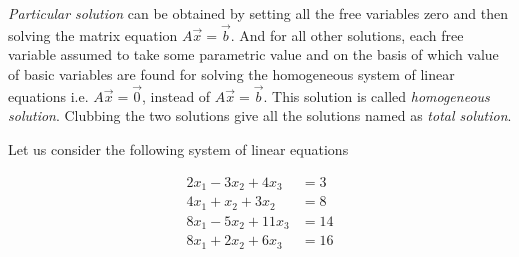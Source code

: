 \documentclass{article}
\begin{document}
\textit{Particular solution} can be obtained by setting all the free variables zero and then solving the matrix equation $A\vec{x}=\vec{b}$. And for all other solutions, each free variable assumed to take some parametric value and on the basis of which value of basic variables are found for solving the homogeneous system of linear equations i.e. $A\vec{x} = \vec{0}$, instead of $A\vec{x} = \vec{b}$. This solution is called \textit{homogeneous solution}. Clubbing the two solutions give all the solutions named as \textit{total solution}.




  


Let us consider the following system of linear equations

\[
\begin{split}
    2x_1 - 3x_2 + 4x_3 &= 3\\
    4x_1 + x_2 + 3x_2 &= 8\\
    8x_1 - 5x_2 + 11x_3 &= 14\\
    8x_1 + 2x_2 + 6x_3 &= 16
\end{split}
\]
\end{document}
